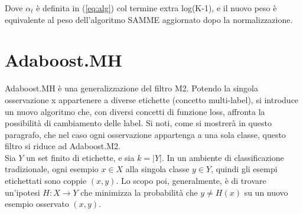 Dove \begin{math}\alpha_t \end{math} \`e definita in (\ref{eq:alg}) col termine extra log(K-1), e il nuovo peso 
\`e equivalente al peso dell'algoritmo SAMME aggiornato dopo la normalizzazione.




\section{Adaboost.MH}
Adaboost.MH \`e una generalizzazione del filtro M2. Potendo la singola osservazione x appartenere a diverse 
etichette (concetto multi-label), 
si introduce un nuovo algoritmo che, con diversi concetti di funzione loss, affronta la possibilit\`a 
di cambiamento delle label. Si 
noti, come si mostrer\`a in questo paragrafo, che nel caso ogni osservazione appartenga a una sola classe, questo 
filtro si riduce ad Adaboost.M2.\\
\newline
Sia \begin{math}
     Y 
    \end{math} un set finito di etichette, e sia \begin{math}
                                                           k = |Y|
                                                          \end{math}. In un ambiente di classificazione 
tradizionale, ogni esempio \begin{math}
     x \in X 
    \end{math} alla singola classe \begin{math}
     y \in Y 
    \end{math}, quindi gli esempi etichettati sono coppie \begin{math}
                                                           (x,y)
                                                          \end{math}. Lo scopo poi, generalmente, 
\`e di trovare un'ipotesi \begin{math}
                         H : X \rightarrow Y
                        \end{math} che minimizza la probabilit\`a che \begin{math}
                                                                       y \ne H(x)
                                                                      \end{math} su un nuovo 
esempio osservato \begin{math}  (x,y) \end{math}. \\
